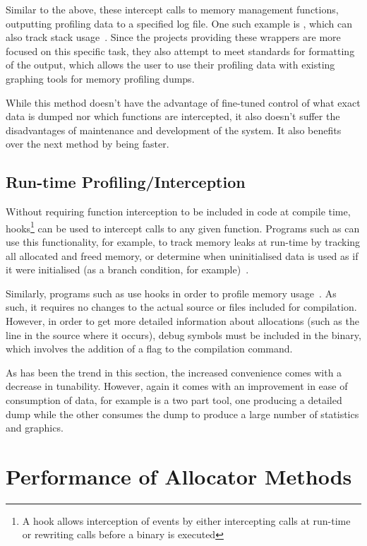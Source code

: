 Similar to the above, these intercept calls to memory management functions, outputting profiling data to a specified log file. One such example is , which can also track stack usage~\cite{malloccount}. Since the projects providing these wrappers are more focused on this specific task, they also attempt to meet standards for formatting of the output, which allows the user to use their profiling data with existing graphing tools for memory profiling dumps.

While this method doesn't have the advantage of fine-tuned control of what exact data is dumped nor which functions are intercepted, it also doesn't suffer the disadvantages of maintenance and development of the system. It also benefits over the next method by being faster.

\subsection{Run-time Profiling/Interception}

Without requiring function interception to be included in code at compile time, hooks\footnote{A hook allows interception of events by either intercepting calls at run-time or rewriting calls before a binary is executed} can be used to intercept calls to any given function. Programs such as  can use this functionality, for example, to track memory leaks at run-time by tracking all allocated and freed memory, or determine when uninitialised data is used as if it were initialised (as a branch condition, for example)~\cite{valgrind}.

Similarly, programs such as  use hooks in order to profile memory usage~\cite{heaptrack}. As such, it requires no changes to the actual source or files included for compilation. However, in order to get more detailed information about allocations (such as the line in the source where it occurs), debug symbols must be included in the binary, which involves the addition of a flag to the compilation command.

As has been the trend in this section, the increased convenience comes with a decrease in tunability. However, again it comes with an improvement in ease of consumption of data, for example  is a two part tool, one producing a detailed dump while the other consumes the dump to produce a large number of statistics and graphics.

\section{Performance of Allocator Methods}

